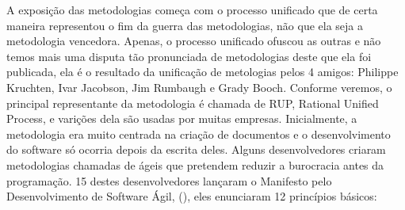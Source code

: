 \documentclass[
	11pt,				%
	openright,
	twoside,			%
	a4paper,			%
	english,			%
	french,
	brazil,				%
	sumario=tradicional
	]{abntex2}
\begin{document}
A exposição das metodologias começa com o processo unificado que de certa maneira representou o fim da guerra das metodologias, não que ela seja a metodologia vencedora. Apenas, o processo unificado ofuscou as outras e não temos mais uma disputa tão pronunciada de metodologias deste que ela foi publicada, ela é o resultado da unificação de metologias pelos 4 amigos: Philippe Kruchten,  Ivar Jacobson, Jim Rumbaugh e Grady Booch. Conforme veremos, o principal representante da metodologia é chamada de RUP, Rational Unified Process, e varições dela são usadas por muitas empresas. Inicialmente, a metodologia era muito centrada na criação de documentos e o desenvolvimento do software só ocorria depois da escrita deles. Alguns desenvolvedores criaram metodologias chamadas de ágeis que pretendem reduzir a burocracia antes da programação. 15 destes desenvolvedores lançaram o Manifesto pelo Desenvolvimento de Software Ágil, (), eles enunciaram 12 princípios básicos:
\end{document}
